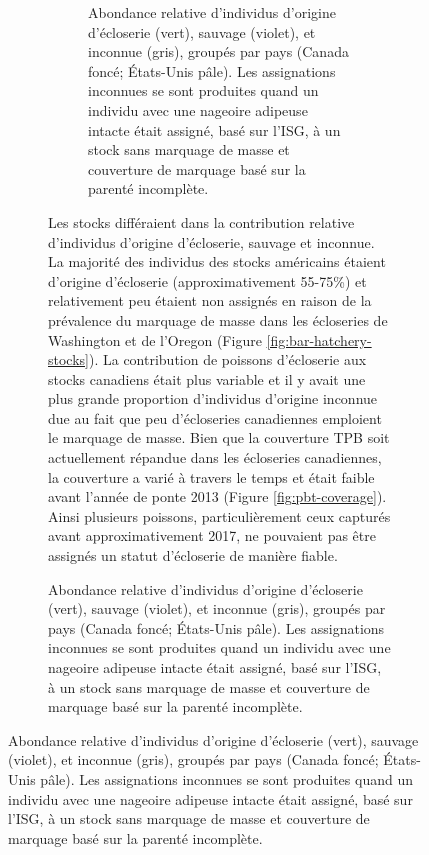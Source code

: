 \begin{figure}[H]
\begin{figure}[H]
\begin{figure}[H]
    \centering
    \caption{Abondance relative d'individus d'origine d'écloserie (vert), sauvage (violet), et inconnue (gris), groupés par pays (Canada foncé; États-Unis pâle). Les assignations inconnues se sont produites quand un individu avec une nageoire adipeuse intacte était assigné, basé sur l'ISG, à un stock sans marquage de masse et couverture de marquage basé sur la parenté incomplète.}
    \label{fig:bar-hatchery-summer}
\end{figure}

Les stocks différaient dans la contribution relative d'individus d'origine d'écloserie, sauvage et inconnue. La majorité des individus des stocks américains étaient d'origine d'écloserie (approximativement 55-75\%) et relativement peu étaient non assignés en raison de la prévalence du marquage de masse dans les écloseries de Washington et de l'Oregon (Figure \ref{fig:bar-hatchery-stocks}). La contribution de poissons d'écloserie aux stocks canadiens était plus variable et il y avait une plus grande proportion d'individus d'origine inconnue due au fait que peu d'écloseries canadiennes emploient le marquage de masse. Bien que la couverture TPB soit actuellement répandue dans les écloseries canadiennes, la couverture a varié à travers le temps et était faible avant l'année de ponte 2013 (Figure \ref{fig:pbt-coverage}). Ainsi plusieurs poissons, particulièrement ceux capturés avant approximativement 2017, ne pouvaient pas être assignés un statut d'écloserie de manière fiable.


\end{figure}
\end{figure}
